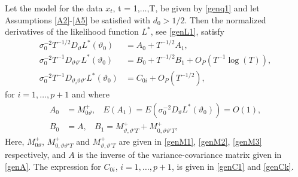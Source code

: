 {{\begin{lemma} \label{asyappgennon1}
Let the model for the data $x_t$, t = 1,$\ldots$,T, be given by \eqref{genq1} and let Assumptions \ref{A2}-\ref{A5} be satisfied with $d_0 > 1/2$. Then the normalized derivatives of the likelihood function $L^*$, see \eqref{genL1}, satisfy
\begin{align}
    \sigma_0^{-2} T^{-1/2} D_{\vartheta} L^*(\vartheta_0)  &= A_{0} + T^{-1/2} A_{1}, \label{17a} \\
    \sigma_0^{-2} T^{-1} D_{\vartheta \vartheta'} L^*(\vartheta_0)  &= B_{0} + T^{-1/2}  B_{1} + O_P(T^{-1} \log(T) ), \label{17b}\\
    \sigma_0^{-2} T^{-1} D_{\vartheta_i \vartheta \vartheta'} L^*(\vartheta_0)  &= C_{0i} + O_P(T^{-1/2}), \label{17c}
\end{align}
for $i = 1,\ldots,p+1$ and where
\begin{align*}
A_{0} &= M_{0\vartheta}^{+}, \ \ \ \ E(A_{1}) = E(\sigma^{-2}_0 D_{\vartheta} L^*(\vartheta_0) ) = O(1), \\
B_{0} &= A, \ \ \ \ B_1 = M_{\vartheta,\vartheta' T}^{+} + M_{0,\vartheta \vartheta' T}^{+}, 
\end{align*}
Here,
$M_{0\vartheta}^{+}$, $M_{0,\vartheta \vartheta' T}^{+}$ and $M_{\vartheta,\vartheta' T}^{+}$ are given in \eqref{genM1}, \eqref{genM2}, \eqref{genM3} respectively,
and $A$ is the inverse of the variance-covariance matrix given in \eqref{genA}. The expression for $C_{0i}$, $i = 1,\ldots,p+1$, is given in \eqref{genC1} and \eqref{genCk}. 
\end{lemma}



}}
